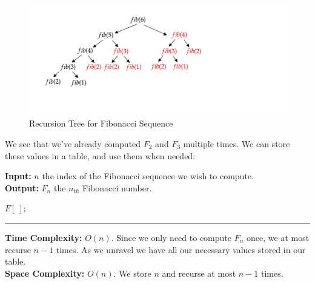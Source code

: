 \begin{figure}[h]


\hspace{5em} \includegraphics[width=1\textwidth]{Sections/dp/fib.png}

\vspace{-3em}
\caption{Recursion Tree for Fibonacci Sequence}
\label{fig:fib}
\end{figure}

\noindent
We see that we've already computed $F_2$ and $F_3$ multiple times. We can store these values in a table, and use them when needed:

\begin{Func}

    \textbf{Input:} $n$ the index of the Fibonacci sequence we wish to compute.\\
    \textbf{Output:} $F_n$ the $n_{th}$ Fibonacci number.\\

    \vspace{-.5em}
    \begin{algorithm}[H]
        \SetAlgoLined
        $F[\ ]$; 
    \end{algorithm}
    \noindent
    \rule{\textwidth}{0.4pt}
    \textbf{Time Complexity:} $O(n)$. Since we only need to compute $F_n$ once, we at most recurse $n-1$ times. As
    we unravel we have all our necessary values stored in our table.\\
    \textbf{Space Complexity:} $O(n)$. We store $n$ and recurse at most $n-1$ times.
\end{Func}


